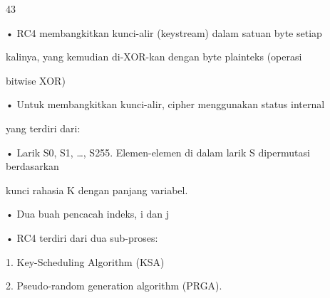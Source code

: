 \documentclass{article}
\begin{document}

43

• RC4 membangkitkan kunci-alir (keystream) dalam satuan byte setiap 

kalinya, yang kemudian di-XOR-kan dengan byte plainteks (operasi 

bitwise XOR)

• Untuk membangkitkan kunci-alir, cipher menggunakan status internal 

yang terdiri dari:

• Larik S0, S1, …, S255. Elemen-elemen di dalam larik S dipermutasi berdasarkan 

kunci rahasia K dengan panjang variabel. 

• Dua buah pencacah indeks, i dan j  

• RC4 terdiri dari dua sub-proses:


1. Key-Scheduling Algorithm (KSA)


2. Pseudo-random generation algorithm (PRGA).
\end{document}
